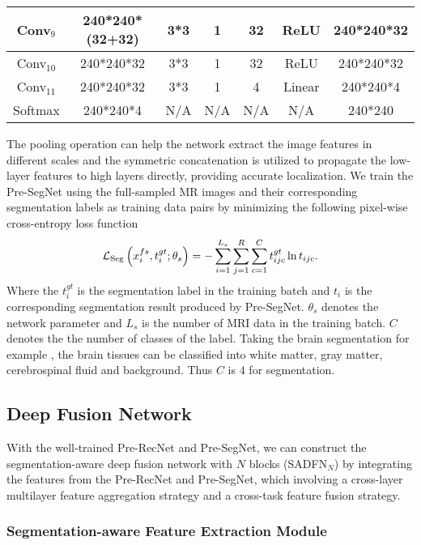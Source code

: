 \documentclass[runningheads]{llncs}
\begin{document}
\begin{table}[]
\begin{tabular}{|c|c|c|c|c|c|c|}
Conv$_9$       & 240*240*(32+32)  & 3*3         & 1      & 32                & ReLU       & 240*240*32      \\ \hline
Conv$_{10}$       & 240*240*32  & 3*3         & 1      & 32                & ReLU       & 240*240*32      \\ \hline
Conv$_{11}$       & 240*240*32  & 3*3         & 1      & 4                 & Linear       & 240*240*4         \\ \hline
Softmax      & 240*240*4     & N/A         & N/A    & N/A               & N/A        & 240*240         \\ \hline
\end{tabular}
\end{table}
The pooling operation can help the network extract the image features in different scales and the symmetric concatenation is utilized to propagate the low-layer features to high layers directly, providing accurate localization. We train the Pre-SegNet using the full-sampled MR images and their corresponding segmentation labels as training data pairs by minimizing the following pixel-wise cross-entropy loss function
\begin{equation}\label{eq3}
{{\cal L}_{{\rm{Seg}}}}\left( {x_i^{fs},t_i^{gt};{\theta _s}} \right) =  - \sum\limits_{i = 1}^{{L_s}} {\sum\limits_{j = 1}^R {\sum\limits_{c = 1}^C {t_{ijc}^{gt}} } } \ln {t_{ijc}}.
\end{equation}
Where the ${t_i^{gt}}$ is the segmentation label in the training batch and $t_i$ is the corresponding segmentation result produced by Pre-SegNet. ${\theta _s}$ denotes the network parameter and $L_s$ is the number of MRI data in the training batch. $C$ denotes the the number of classes of the label. Taking the brain segmentation for example \cite{29}, the brain tissues can be classified into white matter, gray matter, cerebrospinal fluid and background. Thus $C$ is $4$ for segmentation.

\subsection{Deep Fusion Network}
\label{DFN}

With the well-trained Pre-RecNet and Pre-SegNet, we can construct the segmentation-aware deep fusion network with $N$ blocks (SADFN$_N$) by integrating the features from the Pre-RecNet and Pre-SegNet, which involving a cross-layer multilayer feature aggregation strategy and a cross-task feature fusion strategy.

\subsubsection{Segmentation-aware Feature Extraction Module}
\label{MLFAinSeg}
\end{document}
